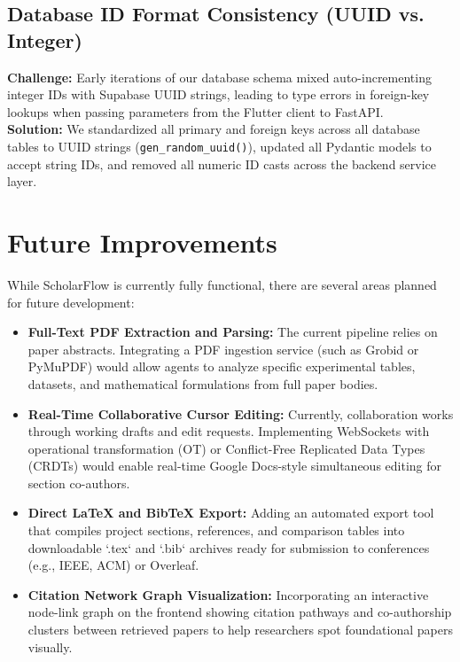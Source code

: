 \documentclass[11pt,a4paper]{article}
\begin{document}
\subsection{Database ID Format Consistency (UUID vs. Integer)}
\textbf{Challenge:} Early iterations of our database schema mixed auto-incrementing integer IDs with Supabase UUID strings, leading to type errors in foreign-key lookups when passing parameters from the Flutter client to FastAPI. \\
\textbf{Solution:} We standardized all primary and foreign keys across all database tables to UUID strings (\texttt{gen\_random\_uuid()}), updated all Pydantic models to accept string IDs, and removed all numeric ID casts across the backend service layer.

\section{Future Improvements}

While ScholarFlow is currently fully functional, there are several areas planned for future development:

\begin{itemize}
    \item \textbf{Full-Text PDF Extraction and Parsing:} The current pipeline relies on paper abstracts. Integrating a PDF ingestion service (such as Grobid or PyMuPDF) would allow agents to analyze specific experimental tables, datasets, and mathematical formulations from full paper bodies.
    \item \textbf{Real-Time Collaborative Cursor Editing:} Currently, collaboration works through working drafts and edit requests. Implementing WebSockets with operational transformation (OT) or Conflict-Free Replicated Data Types (CRDTs) would enable real-time Google Docs-style simultaneous editing for section co-authors.
    \item \textbf{Direct LaTeX and BibTeX Export:} Adding an automated export tool that compiles project sections, references, and comparison tables into downloadable `.tex` and `.bib` archives ready for submission to conferences (e.g., IEEE, ACM) or Overleaf.
    \item \textbf{Citation Network Graph Visualization:} Incorporating an interactive node-link graph on the frontend showing citation pathways and co-authorship clusters between retrieved papers to help researchers spot foundational papers visually.
\end{itemize}
\end{document}
